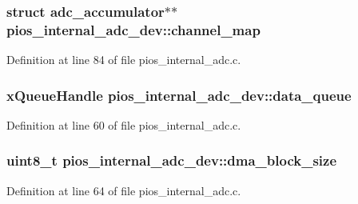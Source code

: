 \hypertarget{structpios__internal__adc__dev_aa18abba8a0b737db0f38d7253ac9f4ef}{
\subsubsection[{channel\-\_\-map}]{\setlength{\rightskip}{0pt plus 5cm}struct {\bf adc\-\_\-accumulator}$\ast$$\ast$ {\bf pios\-\_\-internal\-\_\-adc\-\_\-dev\-::channel\-\_\-map}}}\label{structpios__internal__adc__dev_aa18abba8a0b737db0f38d7253ac9f4ef}


\-Definition at line 84 of file pios\-\_\-internal\-\_\-adc.\-c.

\hypertarget{structpios__internal__adc__dev_a5ea37fb6d5b52dd2cc6af98f6ff80bc5}{
\subsubsection[{data\-\_\-queue}]{\setlength{\rightskip}{0pt plus 5cm}x\-Queue\-Handle {\bf pios\-\_\-internal\-\_\-adc\-\_\-dev\-::data\-\_\-queue}}}\label{structpios__internal__adc__dev_a5ea37fb6d5b52dd2cc6af98f6ff80bc5}


\-Definition at line 60 of file pios\-\_\-internal\-\_\-adc.\-c.

\hypertarget{structpios__internal__adc__dev_af50bdd9964256ab4fb17e93ed4447a6c}{
\subsubsection[{dma\-\_\-block\-\_\-size}]{\setlength{\rightskip}{0pt plus 5cm}uint8\-\_\-t {\bf pios\-\_\-internal\-\_\-adc\-\_\-dev\-::dma\-\_\-block\-\_\-size}}}\label{structpios__internal__adc__dev_af50bdd9964256ab4fb17e93ed4447a6c}


\-Definition at line 64 of file pios\-\_\-internal\-\_\-adc.\-c.

